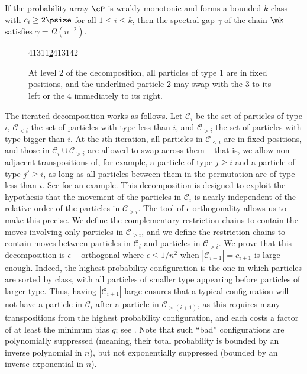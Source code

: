 \newtheorem*{thm:mk}{}

\begin{theorem}\label{pprocess}
%
%
If the probability array $\cP$ is   %
weakly monotonic and %
forms  %
a bounded $k$-class
with  $c_i\geq 2\psize$ for all $1\leq i \leq k$, 
then the spectral gap $\gamma$ of the chain $\mk$ satisfies
\abovedisplayskip=3pt
\belowdisplayskip=3pt
$\gamma =\Omega(n^{-2}).$
\end{theorem}

\begin{figure}[]
  \centering
    \newcommand{\one}{{\color{gray}1}}
     {\color{red} 4\one 3\one \one \underline{2}4\one 3\one 42}\\
    \caption{At level 2 of the decomposition, all particles of type 1 are in fixed positions, and the underlined particle 2 may swap with the 3 to its left or the 4 immediately to its right.}
\label{fig:SwapAcross}
\end{figure}

The iterated decomposition works as follows. Let $\mathcal{C}_{i}$ be 
the set of particles of type $i$, $\mathcal{C}_{<i}$ the set of 
particles with type less than $i$, and $\mathcal{C}_{>i}$ the set of 
particles with type bigger than $i$. At the $i$th iteration, all 
particles in $\mathcal{C}_{<i}$ are in fixed positions, and those in 
$\mathcal{C}_{i}\cup \mathcal{C}_{>i}$ are allowed to swap across them
-- that is, we allow non-adjacent transpositions of, for example, a particle 
of type $j\geq i$ and a particle of type $j'\geq i$, as long as all particles 
between them in the permutation are of type less than $i$. %
%
%
%
See 
for an example.  %
This decomposition is designed to 
exploit the hypothesis that the movement of the particles in 
$\mathcal{C}_{i}$ is nearly independent of the relative order of the 
particles in $\mathcal{C}_{>i}$.  The tool of $\epsilon$-orthogonality 
allows us to make this precise.  We define the complementary 
restriction chains to contain the moves involving only particles in 
$\mathcal{C}_{>i}$, and we define the restriction chains to contain 
moves between particles in $\mathcal{C}_{i}$ and particles in 
$\mathcal{C}_{>i}$. We prove that this decomposition is 
%
$\epsilon-$orthogonal where $\epsilon\leq 1/n^2$ %
when $|\mathcal{C}_{i+1}| = c_{i+1}$ is large 
enough.  Indeed, the highest probability configuration is the one in 
which particles are sorted by class, with all particles of smaller type 
appearing before particles of larger type.  Thus, having 
$|\mathcal{C}_{i+1}|$ large ensures that a typical configuration will 
not have a particle in $\mathcal{C}_{i}$ after a particle in 
$\mathcal{C}_{>(i+1)}$, as this requires many transpositions from the 
highest probability configuration, and each costs a factor of at least 
the minimum bias $q$; see .  Note that such 
``bad'' configurations are polynomially suppressed 
(meaning, their total probability is bounded by an inverse polynomial in $n$), %
but not exponentially suppressed
(bounded by an inverse exponential in $n$).  %
%
%

